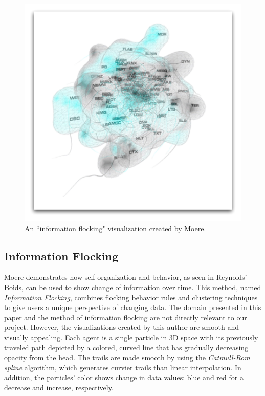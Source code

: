 \documentclass[conference]{IEEEtran}
\begin{document}
\begin{figure}
\centering
\includegraphics[scale=.5]{images/blob.pdf}
\caption{An ``information flocking" visualization created by Moere\cite{1382896}.}
\label{Blob}
\end{figure}

\subsection{Information Flocking}
Moere demonstrates how self-organization and behavior, as seen in Reynolds' Boids, can be used to show change of information over time\cite{1382896}. This method, named {\em Information Flocking}, combines flocking behavior rules
and clustering techniques to give users a unique perspective of changing data.
The domain presented in this paper and the method of information flocking are not directly relevant to our project.
However, the visualizations created by this author are smooth and visually appealing.
Each agent is a single particle in 3D space with its previously traveled path depicted by a colored,
curved line that has gradually decreasing opacity from the head.
The trails are made smooth by using the {\em Catmull-Rom spline} algorithm,
which generates curvier trails than linear interpolation.
In addition, the particles' color shows change in data values: blue and red for a decrease and increase, respectively.
\end{document}
